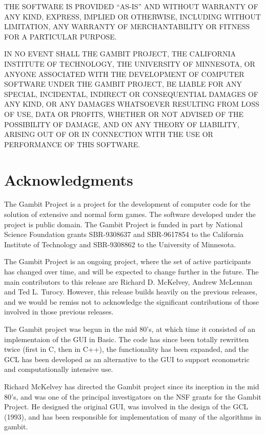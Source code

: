 THE SOFTWARE IS PROVIDED ``AS-IS'' AND WITHOUT WARRANTY OF ANY KIND,
EXPRESS, IMPLIED OR OTHERWISE, INCLUDING WITHOUT LIMITATION, ANY
WARRANTY OF MERCHANTABILITY OR FITNESS FOR A PARTICULAR PURPOSE.
 
IN NO EVENT SHALL THE GAMBIT PROJECT, THE CALIFORNIA INSTITUTE OF
TECHNOLOGY, THE UNIVERSITY OF MINNESOTA, OR ANYONE ASSOCIATED WITH THE
DEVELOPMENT OF COMPUTER SOFTWARE UNDER THE GAMBIT PROJECT, BE LIABLE
FOR ANY SPECIAL, INCIDENTAL, INDIRECT OR CONSEQUENTIAL DAMAGES OF ANY
KIND, OR ANY DAMAGES WHATSOEVER RESULTING FROM LOSS OF USE, DATA OR
PROFITS, WHETHER OR NOT ADVISED OF THE POSSIBILITY OF DAMAGE, AND ON
ANY THEORY OF LIABILITY, ARISING OUT OF OR IN CONNECTION WITH THE USE
OR PERFORMANCE OF THIS SOFTWARE.


\chapter*{Acknowledgments}\label{gambitproject}

The Gambit Project is a project for the development of computer code
for the solution of extensive and normal form games.  The software
developed under the project is public domain. The Gambit Project is
funded in part by National Science Foundation grants SBR-9308637 and
SBR-9617854 to the California Institute of Technology and SBR-9308862
to the University of Minnesota.

The Gambit Project is an ongoing project, where the set of active
participants has changed over time, and will be expected to change
further in the future.  The main contributors to this release are
Richard D. McKelvey, Andrew McLennan and Ted L. Turocy.  However, this
release builds heavily on the previous releases, and we would be
remiss not to acknowledge the significant contributions of those
involved in those previous releases.

The Gambit project was begun in the mid 80's, at which time it
consisted of an implementaion of the GUI in Basic.  The code has since
been totally rewritten twice (first in C, then in C++), the
functionality has been expanded, and the GCL has been developed as an
alternative to the GUI to support econometric and computationally
intensive use.

Richard McKelvey has directed the Gambit project since its inception
in the mid 80's, and was one of the principal investigators on the NSF
grants for the Gambit Project.  He designed the original GUI, was
involved in the design of the GCL (1993), and has been responsible for
implementation of many of the algorithms in gambit.


